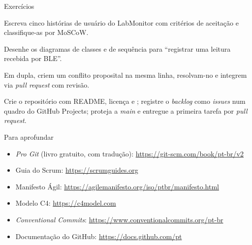\documentclass[aspectratio=169,10pt]{beamer}
\begin{document}
\begin{frame}{Exercícios}
  \begin{exercicio}
    Escreva cinco histórias de usuário do LabMonitor com critérios de aceitação e classifique-as por MoSCoW.
  \end{exercicio}
  \begin{exercicio}
    Desenhe os diagramas de classes e de sequência para ``registrar uma leitura recebida por BLE''.
  \end{exercicio}
  \begin{exercicio}
    Em dupla, criem um conflito proposital na mesma linha, resolvam-no e integrem via \emph{pull request} com revisão.
  \end{exercicio}
  \begin{projeto}
    Crie o repositório com README, licença e ; registre o \emph{backlog} como \emph{issues} num quadro do GitHub Projects; proteja a \emph{main} e entregue a primeira tarefa por \emph{pull request}.
  \end{projeto}
\end{frame}

\begin{frame}{Para aprofundar}
  \small
  \begin{itemize}
    \item \emph{Pro Git} (livro gratuito, com tradução): \url{https://git-scm.com/book/pt-br/v2}
    \item Guia do Scrum: \url{https://scrumguides.org}
    \item Manifesto Ágil: \url{https://agilemanifesto.org/iso/ptbr/manifesto.html}
    \item Modelo C4: \url{https://c4model.com}
    \item \emph{Conventional Commits}: \url{https://www.conventionalcommits.org/pt-br}
    \item Documentação do GitHub: \url{https://docs.github.com/pt}
  \end{itemize}
\end{frame}
\end{document}
